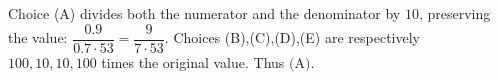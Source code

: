 Choice (A) divides both the numerator and the denominator by $10$, preserving the value: $\dfrac{0.9}{0.7\cdot53}=\dfrac{9}{7\cdot53}$. Choices (B),(C),(D),(E) are respectively $100,10,10,100$ times the original value. Thus $\boxed{\text{(A)}}$.
